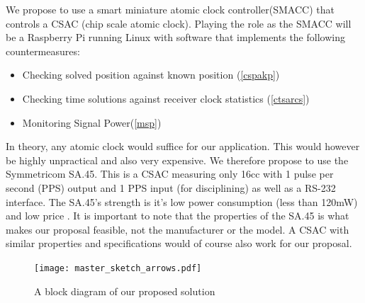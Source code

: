\documentclass[12pt,english,a4paper]{article}
\begin{document}

We propose to use a smart miniature atomic clock controller(SMACC) that controls a CSAC (chip scale atomic clock). Playing the role as the SMACC will be a Raspberry Pi running Linux with software that implements the following countermeasures:
\begin{itemize}
  \item Checking solved position against known position (\ref{cspakp})
  \item Checking time solutions against receiver clock statistics (\ref{ctsarcs})
  \item Monitoring Signal Power(\ref{msp})
\end{itemize}
In theory, any atomic clock would suffice for our application. This would however be highly unpractical and also very expensive. We therefore propose to use the Symmetricom SA.45. This is a CSAC measuring only 16cc with 1 pulse per second (PPS) output and 1 PPS input (for disciplining) as well as a RS-232 interface. The SA.45's strength is it's low power consumption (less than 120mW) and low price \cite{SADS}. It is important to note that the properties of the SA.45 is what makes our proposal feasible, not the manufacturer or the model. A CSAC with similar properties and specifications would of course also work for our proposal.
\begin{figure}\label{bd}
  \texttt{[image: master\_sketch\_arrows.pdf]}
   \caption[CSAC SMACC Block diagram]{A block diagram of our proposed solution}
\end{figure}
\end{document}
